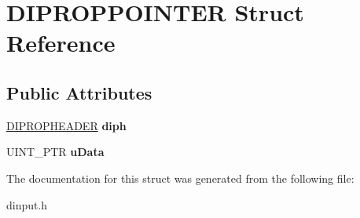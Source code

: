 \hypertarget{struct_d_i_p_r_o_p_p_o_i_n_t_e_r}{\section{D\-I\-P\-R\-O\-P\-P\-O\-I\-N\-T\-E\-R Struct Reference}
\label{struct_d_i_p_r_o_p_p_o_i_n_t_e_r}
}
\subsection*{Public Attributes}
\begin{DoxyCompactItemize}
\item 
\hypertarget{struct_d_i_p_r_o_p_p_o_i_n_t_e_r_add22f32c7174dde5d8e2e3bccde5662d}{\hyperlink{struct_d_i_p_r_o_p_h_e_a_d_e_r}{D\-I\-P\-R\-O\-P\-H\-E\-A\-D\-E\-R} {\bfseries diph}}\label{struct_d_i_p_r_o_p_p_o_i_n_t_e_r_add22f32c7174dde5d8e2e3bccde5662d}

\item 
\hypertarget{struct_d_i_p_r_o_p_p_o_i_n_t_e_r_a3689f61f6a4ba804549d84f03b0c3738}{U\-I\-N\-T\-\_\-\-P\-T\-R {\bfseries u\-Data}}\label{struct_d_i_p_r_o_p_p_o_i_n_t_e_r_a3689f61f6a4ba804549d84f03b0c3738}

\end{DoxyCompactItemize}


The documentation for this struct was generated from the following file\-:\begin{DoxyCompactItemize}
\item 
dinput.\-h\end{DoxyCompactItemize}
